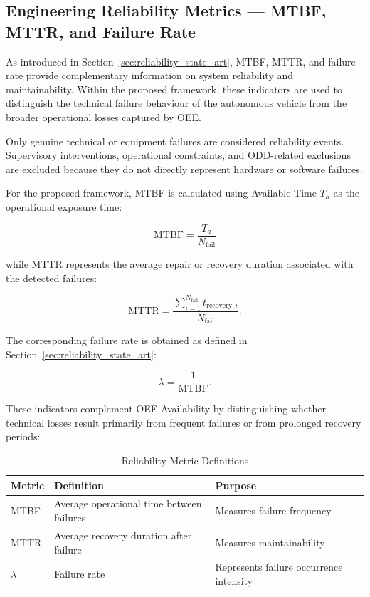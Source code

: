 \subsection{Engineering Reliability Metrics --- MTBF, MTTR, and Failure Rate}

As introduced in Section~\ref{sec:reliability_state_art}, MTBF, MTTR, and failure rate provide complementary information on system reliability and maintainability. Within the proposed framework, these indicators are used to distinguish the technical failure behaviour of the autonomous vehicle from the broader operational losses captured by OEE.

Only genuine technical or equipment failures are considered reliability events. Supervisory interventions, operational constraints, and ODD-related exclusions are excluded because they do not directly represent hardware or software failures.

For the proposed framework, MTBF is calculated using Available Time $T_a$ as the operational exposure time:

\[
\mathrm{MTBF} = \frac{T_a}{N_{\mathrm{fail}}}
\]

while MTTR represents the average repair or recovery duration associated with the detected failures:

\[
\mathrm{MTTR} = \frac{\sum_{i=1}^{N_{\mathrm{fail}}} t_{\mathrm{recovery},i}}{N_{\mathrm{fail}}}.
\]

The corresponding failure rate is obtained as defined in Section~\ref{sec:reliability_state_art}:

\[
\lambda = \frac{1}{\mathrm{MTBF}}.
\]

These indicators complement OEE Availability by distinguishing whether technical losses result primarily from frequent failures or from prolonged recovery periods:

\begin{table}[H]
\small
\renewcommand{\arraystretch}{1.4}
\centering
\caption{Reliability Metric Definitions}
\label{tab:reliability-metric-definitions}
\begin{tabular}{|p{2.4cm}|p{6cm}|p{7cm}|}
\hline
\textbf{Metric} & \textbf{Definition} & \textbf{Purpose} \\
\hline
MTBF & Average operational time between failures & Measures failure frequency \\
\hline
MTTR & Average recovery duration after failure & Measures maintainability \\
\hline
$\lambda$ & Failure rate & Represents failure occurrence intensity \\
\hline
\end{tabular}
\end{table}

